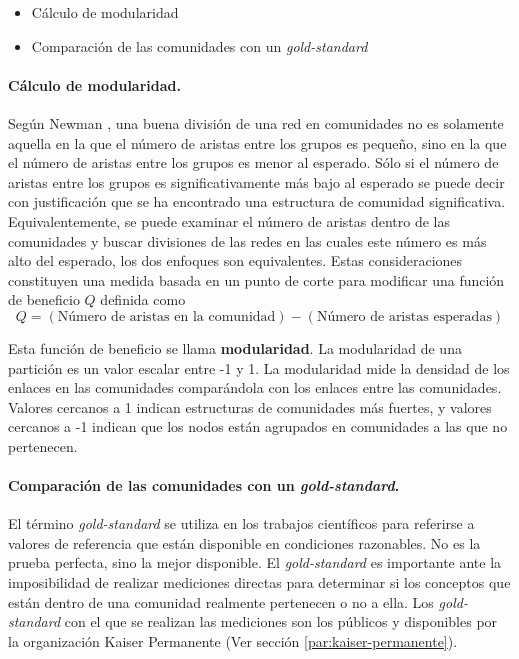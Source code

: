 \begin{itemize}
\item Cálculo de modularidad
\item Comparación de las comunidades con un \textit{gold-standard }
\end{itemize}

\paragraph{Cálculo de modularidad.}
 
Según Newman \cite{Newman2006FindingMatrices.}, una buena división de una red en comunidades no es solamente aquella en la que el número de aristas  entre los grupos es pequeño, sino en la que el número de aristas entre los grupos es menor al esperado. Sólo si el número de aristas entre los grupos es significativamente más bajo al esperado se puede decir con justificación que se ha encontrado una estructura de comunidad significativa. Equivalentemente, se puede examinar el número de aristas dentro de las comunidades y buscar divisiones de las redes en las cuales este número es más alto del esperado, los dos enfoques son equivalentes. Estas consideraciones constituyen una medida basada en un punto de corte para modificar una función de beneficio $Q$ definida como
\begin{equation}
Q =  (\text{Número de aristas en la comunidad}) -  (\text{Número de aristas esperadas})
\end{equation} 

Esta función de beneficio se llama \textbf{modularidad}. La modularidad de una partición es un valor escalar entre -1 y 1. La modularidad mide la densidad de los enlaces en las comunidades comparándola con los enlaces entre las comunidades\cite{Blondel2008FastNetworks}. Valores cercanos a 1 indican estructuras de comunidades más fuertes, y valores cercanos a -1 indican que los nodos están agrupados en comunidades a las que no pertenecen\cite{Tang2010}.

\paragraph{Comparación de las comunidades con un \textit{gold-standard}.}
\label{par:cubrimiento}

El término \textit{gold-standard} \cite{Versi1992quotGoldTerm.} se utiliza en los trabajos científicos para referirse a valores de referencia que están disponible en condiciones razonables. No es la prueba perfecta, sino la mejor disponible. El \textit{gold-standard} es importante ante la imposibilidad de realizar mediciones directas para determinar si los conceptos que están dentro de una comunidad realmente pertenecen o no a ella. Los \textit{gold-standard} con el que se realizan las mediciones son los públicos y disponibles por la organización Kaiser Permanente (Ver sección \ref{par:kaiser-permanente}).

